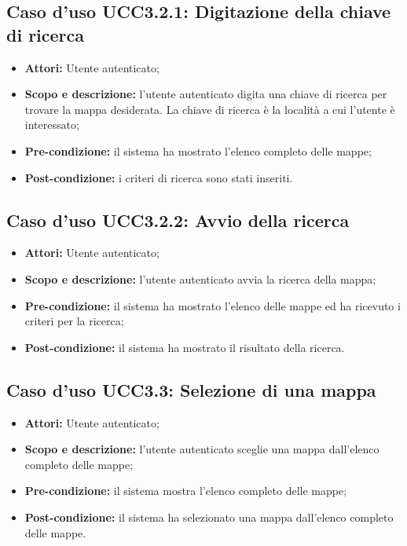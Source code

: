 \subsection{Caso d'uso UCC3.2.1: Digitazione della chiave di ricerca}

\begin{itemize}
\item \textbf{Attori:} Utente autenticato;
\item \textbf{Scopo e descrizione:} l'utente autenticato digita una chiave di ricerca per trovare la mappa desiderata. La chiave di ricerca è la località a cui l'utente è interessato;
\item \textbf{Pre-condizione:} il sistema ha mostrato l'elenco completo delle mappe;
\item \textbf{Post-condizione:} i criteri di ricerca sono stati inseriti.
\end{itemize}

\subsection{Caso d'uso UCC3.2.2: Avvio della ricerca}

\begin{itemize}
\item \textbf{Attori:} Utente autenticato;
\item \textbf{Scopo e descrizione:} l'utente autenticato avvia la ricerca della mappa;
\item \textbf{Pre-condizione:} il sistema ha mostrato l'elenco delle mappe ed ha ricevuto i criteri per la ricerca;
\item \textbf{Post-condizione:} il sistema ha mostrato il risultato della ricerca.
\end{itemize}

\subsection{Caso d'uso UCC3.3: Selezione di una mappa}
\begin{itemize}
\item \textbf{Attori:} Utente autenticato;
\item \textbf{Scopo e descrizione:} l'utente autenticato sceglie una mappa dall'elenco completo delle mappe;
\item \textbf{Pre-condizione:} il sistema mostra l'elenco completo delle mappe;
\item \textbf{Post-condizione:} il sistema ha selezionato una mappa dall'elenco completo delle mappe.
\end{itemize}

